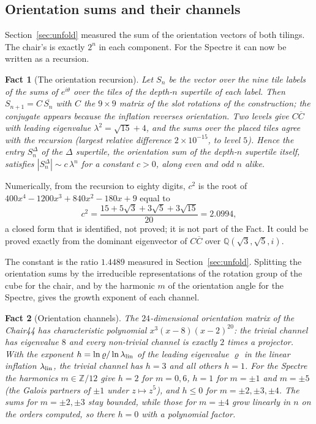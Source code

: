 \documentclass[11pt]{article}
\newtheorem{fact}{Fact}
\theoremstyle{definition}
\theoremstyle{remark}
\newcommand{\lam}{\lambda}
\begin{document}
\subsection{Orientation sums and their channels}

Section~\ref{sec:unfold} measured the sum of the orientation vectors of both tilings.  The chair's is exactly $2^{n}$ in each component.  For the
Spectre it can now be written as a recursion.

\begin{fact}[The orientation recursion]
\label{fact:orientrec}
Let $S_{n}$ be the vector over the nine tile labels of the sums of $e^{i\theta}$ over the tiles of the depth-$n$ supertile
of each label.  Then $S_{n+1}=C\,\overline{S_{n}}$ with $C$ the $9\times9$ matrix of the slot rotations of the construction;
the conjugate appears because the inflation reverses orientation.  Two levels give $C\overline{C}$ with leading eigenvalue
$\lam^{2}=\sqrt{15} + 4$, and the sums over the placed tiles agree with the recursion (largest relative difference $2\times10^{-15}$, to
level $5$).  Hence the entry $S_{n}^{\Delta}$ of the $\Delta$ supertile, the orientation sum of the depth-$n$
supertile itself, satisfies $|S_{n}^{\Delta}|\sim c\,\lam^{n}$ for a constant $c>0$, along even and odd $n$ alike.
\end{fact}

\noindent
Numerically, from the recursion to eighty digits, $c^{2}$ is the root of $400x^{4}-1200x^{3}+840x^{2}-180x+9$ equal to
\[
c^{2}=\frac{15+5\sqrt3+3\sqrt5+3\sqrt{15}}{20}=2.0994,
\]
a closed form that is identified, not proved; it is not part of the Fact.  It could be proved exactly from the dominant
eigenvector of $C\overline{C}$ over $\mathbb{Q}(\sqrt3,\sqrt5,i)$.

\noindent
The constant is the ratio $1.4489$ measured in Section~\ref{sec:unfold}.  Splitting the orientation sums by the
irreducible representations of the rotation group of the cube for the chair, and by the harmonic $m$ of the orientation
angle for the Spectre, gives the growth exponent of each channel.

\begin{fact}[Orientation channels]
\label{fact:channels}
The $24$-dimensional orientation matrix of the Chair44 has characteristic polynomial $x^{3}(x-8)(x-2)^{20}$: the trivial
channel has eigenvalue $8$ and every non-trivial channel is exactly $2$ times a projector.  With the exponent
$h=\ln\varrho/\ln\lam_{\rm lin}$ of the leading eigenvalue $\varrho$ in the linear inflation $\lam_{\rm lin}$, the trivial channel
has $h=3$ and all others $h=1$.  For the Spectre the harmonics $m\in\mathbb{Z}/12$ give $h=2$ for $m=0,6$, $h=1$ for
$m=\pm1$ and $m=\pm5$ (the Galois partners of $\pm1$ under $z\mapsto z^{5}$), and $h\le0$ for $m=\pm2,\pm3,\pm4$.  The sums for
$m=\pm2,\pm3$ stay bounded, while those for $m=\pm4$ grow linearly in $n$ on the orders computed, so there $h=0$ with a
polynomial factor.
\end{fact}
\end{document}
